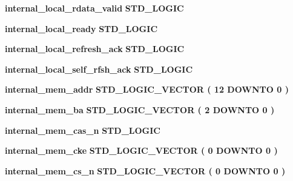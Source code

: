 \begin{DoxyCompactItemize}
\item 
{\bf internal\+\_\+local\+\_\+rdata\+\_\+valid} {\bfseries \textcolor{comment}{S\+T\+D\+\_\+\+L\+O\+G\+IC}\textcolor{vhdlchar}{ }} 
\item 
{\bf internal\+\_\+local\+\_\+ready} {\bfseries \textcolor{comment}{S\+T\+D\+\_\+\+L\+O\+G\+IC}\textcolor{vhdlchar}{ }} 
\item 
{\bf internal\+\_\+local\+\_\+refresh\+\_\+ack} {\bfseries \textcolor{comment}{S\+T\+D\+\_\+\+L\+O\+G\+IC}\textcolor{vhdlchar}{ }} 
\item 
{\bf internal\+\_\+local\+\_\+self\+\_\+rfsh\+\_\+ack} {\bfseries \textcolor{comment}{S\+T\+D\+\_\+\+L\+O\+G\+IC}\textcolor{vhdlchar}{ }} 
\item 
{\bf internal\+\_\+mem\+\_\+addr} {\bfseries \textcolor{comment}{S\+T\+D\+\_\+\+L\+O\+G\+I\+C\+\_\+\+V\+E\+C\+T\+OR}\textcolor{vhdlchar}{ }\textcolor{vhdlchar}{(}\textcolor{vhdlchar}{ }\textcolor{vhdlchar}{ } \textcolor{vhdldigit}{12} \textcolor{vhdlchar}{ }\textcolor{keywordflow}{D\+O\+W\+N\+TO}\textcolor{vhdlchar}{ }\textcolor{vhdlchar}{ } \textcolor{vhdldigit}{0} \textcolor{vhdlchar}{ }\textcolor{vhdlchar}{)}\textcolor{vhdlchar}{ }} 
\item 
{\bf internal\+\_\+mem\+\_\+ba} {\bfseries \textcolor{comment}{S\+T\+D\+\_\+\+L\+O\+G\+I\+C\+\_\+\+V\+E\+C\+T\+OR}\textcolor{vhdlchar}{ }\textcolor{vhdlchar}{(}\textcolor{vhdlchar}{ }\textcolor{vhdlchar}{ } \textcolor{vhdldigit}{2} \textcolor{vhdlchar}{ }\textcolor{keywordflow}{D\+O\+W\+N\+TO}\textcolor{vhdlchar}{ }\textcolor{vhdlchar}{ } \textcolor{vhdldigit}{0} \textcolor{vhdlchar}{ }\textcolor{vhdlchar}{)}\textcolor{vhdlchar}{ }} 
\item 
{\bf internal\+\_\+mem\+\_\+cas\+\_\+n} {\bfseries \textcolor{comment}{S\+T\+D\+\_\+\+L\+O\+G\+IC}\textcolor{vhdlchar}{ }} 
\item 
{\bf internal\+\_\+mem\+\_\+cke} {\bfseries \textcolor{comment}{S\+T\+D\+\_\+\+L\+O\+G\+I\+C\+\_\+\+V\+E\+C\+T\+OR}\textcolor{vhdlchar}{ }\textcolor{vhdlchar}{(}\textcolor{vhdlchar}{ }\textcolor{vhdlchar}{ } \textcolor{vhdldigit}{0} \textcolor{vhdlchar}{ }\textcolor{keywordflow}{D\+O\+W\+N\+TO}\textcolor{vhdlchar}{ }\textcolor{vhdlchar}{ } \textcolor{vhdldigit}{0} \textcolor{vhdlchar}{ }\textcolor{vhdlchar}{)}\textcolor{vhdlchar}{ }} 
\item 
{\bf internal\+\_\+mem\+\_\+cs\+\_\+n} {\bfseries \textcolor{comment}{S\+T\+D\+\_\+\+L\+O\+G\+I\+C\+\_\+\+V\+E\+C\+T\+OR}\textcolor{vhdlchar}{ }\textcolor{vhdlchar}{(}\textcolor{vhdlchar}{ }\textcolor{vhdlchar}{ } \textcolor{vhdldigit}{0} \textcolor{vhdlchar}{ }\textcolor{keywordflow}{D\+O\+W\+N\+TO}\textcolor{vhdlchar}{ }\textcolor{vhdlchar}{ } \textcolor{vhdldigit}{0} \textcolor{vhdlchar}{ }\textcolor{vhdlchar}{)}\textcolor{vhdlchar}{ }} 

\end{DoxyCompactItemize}
